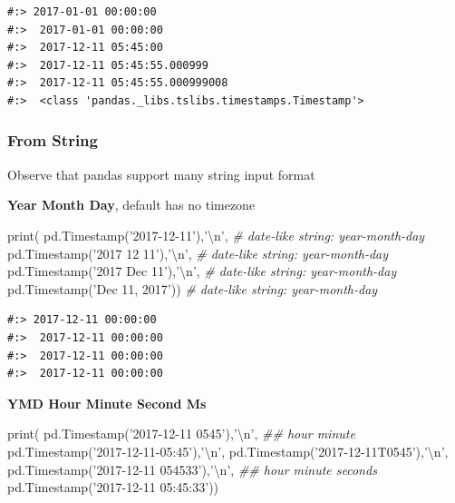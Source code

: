 \documentclass[
]{book}
\newenvironment{Shaded}{\begin{snugshade}}{\end{snugshade}}
\newcommand{\BuiltInTok}[1]{#1}
\newcommand{\CharTok}[1]{\textcolor[rgb]{0.5,0.5,0.5}{#1}}
\newcommand{\CommentTok}[1]{\textcolor[rgb]{0.37,0.37,0.37}{\textit{#1}}}
\newcommand{\NormalTok}[1]{#1}
\newcommand{\StringTok}[1]{\textcolor[rgb]{0.5,0.5,0.5}{#1}}
\begin{document}
\begin{verbatim}
#:> 2017-01-01 00:00:00 
#:>  2017-01-01 00:00:00 
#:>  2017-12-11 05:45:00 
#:>  2017-12-11 05:45:55.000999 
#:>  2017-12-11 05:45:55.000999008 
#:>  <class 'pandas._libs.tslibs.timestamps.Timestamp'>
\end{verbatim}

\hypertarget{from-string}{%
\subsubsection{From String}\label{from-string}}

Observe that pandas support many string input format

\textbf{Year Month Day}, default has no timezone

\begin{Shaded}
\begin{Highlighting}[]
\BuiltInTok{print}\NormalTok{( pd.Timestamp(}\StringTok{'2017-12-11'}\NormalTok{),}\StringTok{'}\CharTok{\textbackslash{}n}\StringTok{'}\NormalTok{,   }\CommentTok{# date-like string: year-month-day}
\NormalTok{       pd.Timestamp(}\StringTok{'2017 12 11'}\NormalTok{),}\StringTok{'}\CharTok{\textbackslash{}n}\StringTok{'}\NormalTok{,   }\CommentTok{# date-like string: year-month-day}
\NormalTok{       pd.Timestamp(}\StringTok{'2017 Dec 11'}\NormalTok{),}\StringTok{'}\CharTok{\textbackslash{}n}\StringTok{'}\NormalTok{,  }\CommentTok{# date-like string: year-month-day}
\NormalTok{       pd.Timestamp(}\StringTok{'Dec 11, 2017'}\NormalTok{))      }\CommentTok{# date-like string: year-month-day}
\end{Highlighting}
\end{Shaded}

\begin{verbatim}
#:> 2017-12-11 00:00:00 
#:>  2017-12-11 00:00:00 
#:>  2017-12-11 00:00:00 
#:>  2017-12-11 00:00:00
\end{verbatim}

\textbf{YMD Hour Minute Second Ms}

\begin{Shaded}
\begin{Highlighting}[]
\BuiltInTok{print}\NormalTok{( pd.Timestamp(}\StringTok{'2017-12-11 0545'}\NormalTok{),}\StringTok{'}\CharTok{\textbackslash{}n}\StringTok{'}\NormalTok{,     }\CommentTok{## hour minute}
\NormalTok{       pd.Timestamp(}\StringTok{'2017-12-11-05:45'}\NormalTok{),}\StringTok{'}\CharTok{\textbackslash{}n}\StringTok{'}\NormalTok{,}
\NormalTok{       pd.Timestamp(}\StringTok{'2017-12-11T0545'}\NormalTok{),}\StringTok{'}\CharTok{\textbackslash{}n}\StringTok{'}\NormalTok{,}
\NormalTok{       pd.Timestamp(}\StringTok{'2017-12-11 054533'}\NormalTok{),}\StringTok{'}\CharTok{\textbackslash{}n}\StringTok{'}\NormalTok{,   }\CommentTok{## hour minute seconds}
\NormalTok{       pd.Timestamp(}\StringTok{'2017-12-11 05:45:33'}\NormalTok{))}
\end{Highlighting}
\end{Shaded}
\end{document}
